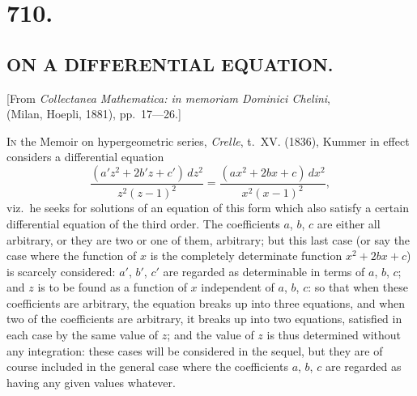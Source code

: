 \documentclass[11pt,a4paper]{book}
\begin{document}
\cleardoublepage

\section*{710.}
\subsection*{ON A DIFFERENTIAL EQUATION.}

\begin{center}
[From \textit{Collectanea Mathematica: in memoriam Dominici Chelini},\\ (Milan, Hoepli, 1881), pp.~17---26.]
\end{center}
\medskip

\textsc{In} the Memoir on hypergeometric series, \textit{Crelle}, t.~XV. (1836), Kummer in effect considers a differential equation
\[
\frac{(a'z^2+2b'z+c')\,dz^2}{z^2(z-1)^2}
=\frac{(ax^2+2bx+c)\,dx^2}{x^2(x-1)^2},
\]
viz.\ he seeks for solutions of an equation of this form which also satisfy a certain differential equation of the third order. The coefficients $a$, $b$, $c$ are either all arbitrary, or they are two or one of them, arbitrary; but this last case (or say the case where the function of $x$ is the completely determinate function $x^2+2bx+c$) is scarcely considered: $a'$, $b'$, $c'$ are regarded as determinable in terms of $a$, $b$, $c$; and $z$ is to be found as a function of $x$ independent of $a$, $b$, $c$: so that when these coefficients are arbitrary, the equation breaks up into three equations, and when two of the coefficients are arbitrary, it breaks up into two equations, satisfied in each case by the same value of $z$; and the value of $z$ is thus determined without any integration: these cases will be considered in the sequel, but they are of course included in the general case where the coefficients $a$, $b$, $c$ are regarded as having any given values whatever.
\end{document}
